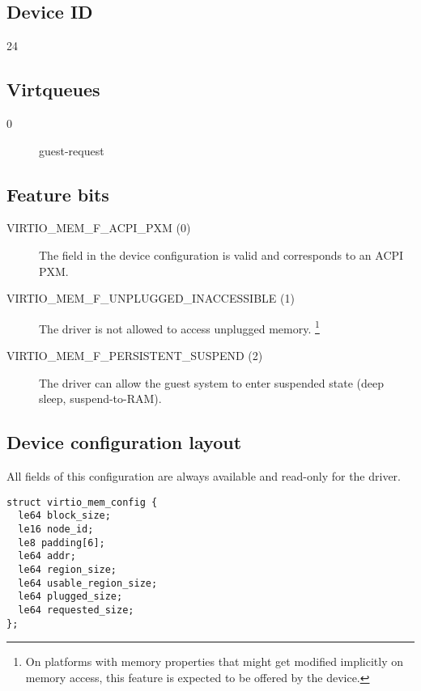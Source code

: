 \subsection{Device ID}\label{sec:Device Types / Memory Device / Device ID}
24

\subsection{Virtqueues}\label{sec:Device Types / Memory Device / Virtqueues}

\begin{description}
\item[0] guest-request
\end{description}

\subsection{Feature bits}\label{sec:Device Types / Memory Device / Feature bits}

\begin{description}
\item[VIRTIO_MEM_F_ACPI_PXM (0)] The field  in the device
configuration is valid and corresponds to an ACPI PXM.
\item[VIRTIO_MEM_F_UNPLUGGED_INACCESSIBLE (1)] The driver is not allowed to
access unplugged memory. \footnote{On platforms with memory properties that
might get modified implicitly on memory access, this feature is expected to
be offered by the device.}
\item[VIRTIO_MEM_F_PERSISTENT_SUSPEND (2)] The driver can allow the guest
system to enter suspended state (deep sleep, suspend-to-RAM).
\end{description}

\subsection{Device configuration layout}\label{sec:Device Types / Memory Device / Device configuration layout}

All fields of this configuration are always available and read-only for the
driver.

\begin{lstlisting}
struct virtio_mem_config {
  le64 block_size;
  le16 node_id;
  le8 padding[6];
  le64 addr;
  le64 region_size;
  le64 usable_region_size;
  le64 plugged_size;
  le64 requested_size;
};
\end{lstlisting}


